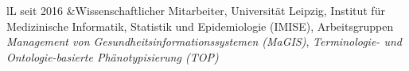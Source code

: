 \documentclass[a4paper,11pt]{article}
\begin{document}
\begin{tabulary}{\textwidth}{lL}
seit 2016			&Wissenschaftlicher Mitarbeiter, Universität Leipzig,\newline
							Institut für Medizinische Informatik, Statistik und Epidemiologie (IMISE),\newline
							Arbeitsgruppen \emph{Management von Gesundheitsinformationssystemen (MaGIS)}, \newline
							\emph{Terminologie- und Ontologie-basierte Phänotypisierung (TOP)}\newline
\end{tabulary}

\end{document}
